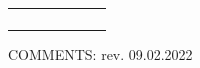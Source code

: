 \documentclass{sop_class}[overrideChapters] %
\begin{document}
{\begin{landscape}
\begin{table}[!htbp]
\begin{threeparttable}
\begin{tabular}{|c|c|c|c|c|c|c|}
            \hline
            {} & {} & {} & {} & {} & {} & {}\\
            \hline
            {} & {} & {} & {} & {} & {} & {}\\
            \hline
            {} & {} & {} & {} & {} & {} & {}\\
            \hline
            {} & {} & {} & {} & {} & {} & {}\\
            \hline
            {} & {} & {} & {} & {} & {} & {}\\
            \hline
            \bottomrule
            \end{tabular}
        \begin{tablenotes}
            \small
            \item COMMENTS: \hfill{} rev. 09.02.2022 \\
            \\
            \\
            \\
        \end{tablenotes}
    \end{threeparttable}
\end{table}
 \end{landscape}
\begin{landscape} %

\end{landscape}}
\end{document}
